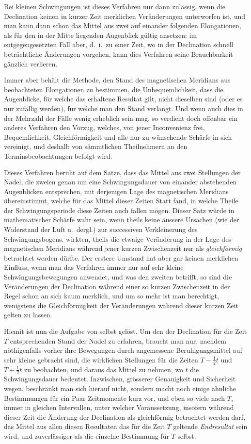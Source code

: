 Bei kleinen Schwingungen ist dieses Verfahren nur dann zulässig, wenn die Declination keinen in kurzer Zeit merklichen Veränderungen unterworfen ist, und man kann dann schon das Mittel aus zwei auf einander folgenden Elongationen, als für den in der Mitte liegenden Augenblick gültig ansetzen: im entgegengesetzten Fall aber, d.\ i.\ zu einer Zeit, wo in der Declination schnell beträchtliche Änderungen vorgehen, kann dies Verfahren seine Brauchbarkeit gänzlich verlieren.

Immer aber behält die Methode, den Stand des magnetischen Meridians aus beobachteten Elongationen zu bestimmen, die Unbequemlichkeit, dass die Augenblicke, für welche das erhaltene Resultat gilt, nicht dieselben sind (oder es nur zufällig werden), für welche man den Stand verlangt. Und wenn auch dies in der Mehrzahl der Fälle wenig erheblich sein mag, so verdient doch offenbar ein anderes Verfahren den Vorzug, welches, von jener Inconvenienz frei, Bequemlichkeit, Gleichförmigkeit und alle nur zu wünschende Schärfe in sich vereinigt, und deshalb von sämmtlichen Theilnehmern an den Terminsbeobachtungen befolgt wird.

Dieses Verfahren beruht auf dem Satze, dass das Mittel aus zwei Stellungen der Nadel, die zweien genau um eine Schwingungsdauer von einander abstehenden Augenblicken entsprechen, mit derjenigen Lage des magnetischen Meridians übereinstimmt, welche für das Mittel dieser Zeiten Statt fand, in welche Theile der Schwingungsperiode diese Zeiten auch fallen mögen. Dieser Satz würde in mathematischer Schärfe wahr sein, wenn theils keine äussere Ursachen (wie der Widerstand der Luft u.\ dergl.) zur successiven Verkleinerung des Schwingungsbogens. wirkten, theils die etwaige Veränderung in der Lage des magnetischen Meridians während jener kurzen Zwischenzeit nur als \textit{gleichförmig} betrachtet werden dürfte. Der erstere Umstand hat aber gar keinen merklichen Einfluss, wenn man das Verfahren immer nur auf sehr kleine Schwingungsbewegungen anwendet, und was den zweiten betrifft, so sind die Veränderungen der Declination während einer so kurzen Zwischenzeit in der Regel schon an sich kaum merklich, und um so mehr ist man berechtigt, wenigstens die Gleichförmigkeit der Veränderungen während dieser kurzen Zeit gelten zu lassen.

Hiemit ist nun die Aufgabe von selbst gelöst. Um den der Declination für die Zeit $T$ entsprechenden Stand der Nadel zu erfahren, braucht man nur, nachdem nöthigenfalls vorher ihre Bewegungen durch angemessene Beruhigungsmittel auf sehr kleine gebracht sind, die wirklichen Stellungen für die Zeiten $T-\tfrac12t$ und $T+\tfrac12t$ zu beobachten, und daraus das Mittel zu nehmen, wo $t$ die Schwingungsdauer bedeutet. Inzwischen, grösserer Genauigkeit und Sicherheit wegen, beschränkt man sich hierauf nicht, sondern macht noch einige ähnliche Bestimmungen für ein Paar Zeitmomente kurz vor, und eben so viele nach $T$, immer in gleichen Intervallen, unter welcher Voraussetzung, insofern während dieser Zeit die Änderung der Declination als gleichförmig betrachtet werden darf, das Mittel aus allen diesen Resultaten das für die Zeit $T$ geltende \textit{Endresultat} sein wird, und zuverlässiger als die einzelne Bestimmung für $T$ selbst.

